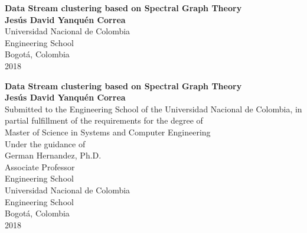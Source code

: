 
\cleardoublepage
\begin{center}
\begin{figure}
\centering%
%
\end{figure}
\thispagestyle{empty} \vspace*{1.5cm} \textbf{\huge
Data Stream clustering based on Spectral Graph Theory}\\[4.0cm]
\Large\textbf{Jesús David Yanquén Correa}\\[5.0cm]
\large Universidad Nacional de Colombia\\
Engineering School\\
Bogotá, Colombia\\
2018\\
\end{center}

\cleardoublepage
\newpage
\begin{center}
\thispagestyle{empty} \vspace*{0cm} \textbf{\huge
Data Stream clustering based on Spectral Graph Theory}\\[3.0cm]
\Large\textbf{Jesús David Yanquén Correa}\\[3.0cm]
\small{Submitted to the Engineering School of the Universidad Nacional de Colombia, in partial fulfillment of the requirements for the degree of}\\[1.0cm]
\large{Master of Science in Systems and Computer Engineering}\\[1.5cm]
\small{Under the guidance of}\\[0.3cm]
\large{German Hernandez, Ph.D.}\\[0.3cm]
\small Associate Professor\\  
Engineering School\\[2.0cm]
\large  Universidad Nacional de Colombia\\
Engineering School\\
Bogotá, Colombia\\
2018\\
\end{center}
